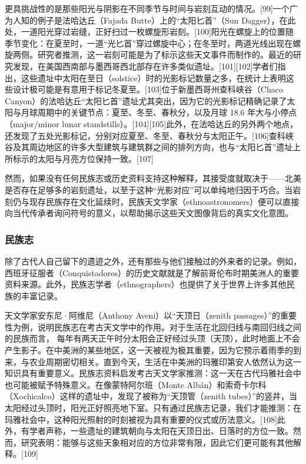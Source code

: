 更具挑战性的是那些阳光与阴影在不同季节与时间与岩刻互动的情况。[99]一个广为人知的例子是法哈达丘（Fajada Butte）上的“太阳匕首”（Sun Dagger），在此处，一道阳光穿过岩缝，正好扫过一枚螺旋形岩刻。[100]阳光在螺旋上的位置随季节变化：在夏至时，一道“光匕首”穿过螺旋中心；在冬至时，两道光线出现在螺旋两侧。研究者推测，这一岩刻可能是为了标示这些天文事件而制作的。最近的研究发现，在美国西南部与墨西哥西北部存在许多类似遗址。[101][102]学者们指出，这些遗址中太阳在至日（solstice）时的光影标记数量之多，在统计上表明这些设计极可能是有意用于标记冬夏至。[103]位于新墨西哥州查科峡谷（Chaco Canyon）的法哈达丘“太阳匕首”遗址尤其突出，因为它的光影标记精确记录了太阳与月球周期中的关键节点：夏至、冬至、春秋分，以及月球 18.6 年大与小停点（major/minor lunar standstills）。[104][105]此外，在法哈达丘的另外两个地点，还发现了五处光影标记，分别对应夏至、冬至、春秋分与太阳正午。[106]查科峡谷及其周边地区的许多大型建筑与建筑群之间的排列方向，也与“太阳匕首”遗址上所标示的太阳与月亮方位保持一致。[107]

然而，如果没有任何民族志或历史资料支持这种解释，其接受度就取决于——北美是否存在足够多的岩刻遗址，以至于这种“光影对应”可以单纯地归因于巧合。当岩刻仍与现存民族存在文化延续时，民族天文学家（ethnoastronomers）便可以直接向当代传承者询问符号的意义，以帮助揭示这些天文图像背后的真实文化意图。
\subsubsection{民族志}
除了古代人自己留下的遗迹之外，还有那些与他们接触过的外来者的记录。例如，西班牙征服者（Conquistadores）的历史文献就是了解前哥伦布时期美洲人的重要资料来源。此外，民族志学者（ethnographers）也提供了关于世界上许多其他民族的丰富记录。

天文学家安东尼·阿维尼（Anthony Aveni）以“天顶日（zenith passages）”的重要性为例，说明民族志在考古天文学中的作用。对于生活在北回归线与南回归线之间的民族而言，
每年有两天正午时分太阳会正好经过头顶（天顶），此时地面上不会产生影子。在中美洲的某些地区，这一天被视为极其重要，因为它预示着雨季的到来，与农业周期密切相关。直到今天，生活在中美洲的玛雅印第安人依然认为这一知识具有重要意义。民族志资料启发考古天文学家推测：这一天在古代玛雅社会中也可能被赋予特殊意义。在像蒙特阿尔班（Monte Albán）和索奇卡尔科（Xochicalco）这样的遗址中，发现了被称为“天顶管（zenith tubes）”的竖井，当太阳经过头顶时，阳光正好照亮地下室。只有通过民族志记录，我们才能推测：在玛雅社会中，这种阳光照射的时刻被视为具有重要的仪式或历法意义。[108]此外，有学者声称，一些遗址的建筑朝向与太阳在天顶日出、日落时的方位一致。然而，研究表明：能够与这些天象相对应的方位非常有限，因此它们更可能有其他解释。[109]

